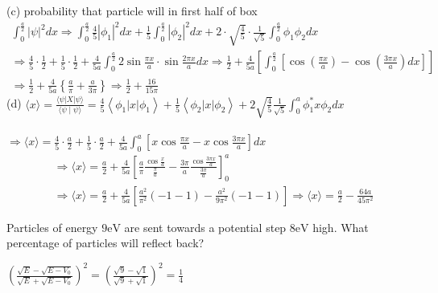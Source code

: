 \begin{enumerate}
\begin{answer}
(c) probability that particle will in first half of box
$$
\begin{gathered}
\int_{0}^{\frac{a}{2}}|\psi|^{2} d x \Rightarrow \int_{0}^{\frac{a}{2}} \frac{4}{5}\left|\phi_{1}\right|^{2} d x+\frac{1}{5} \int_{0}^{\frac{a}{2}}\left|\phi_{2}\right|^{2} d x+2 \cdot \sqrt{\frac{4}{5}} \cdot \frac{1}{\sqrt{5}} \int_{0}^{\frac{a}{2}} \phi_{1} \phi_{2} d x \\
\Rightarrow \frac{4}{5} \cdot \frac{1}{2}+\frac{1}{5} \cdot \frac{1}{2}+\frac{4}{5 a} \int_{0}^{\frac{a}{2}} 2 \sin \frac{\pi x}{a} \cdot \sin \frac{2 \pi x}{a} d x \Rightarrow \frac{1}{2}+\frac{4}{5 a}\left[\int_{0}^{\frac{a}{2}}\left[\cos \left(\frac{\pi x}{a}\right)-\cos \left(\frac{3 \pi x}{a}\right) d x\right]\right] \\
\Rightarrow \frac{1}{2}+\frac{4}{5 a}\left\{\frac{a}{\pi}+\frac{a}{3 \pi}\right\} \Rightarrow \frac{1}{2}+\frac{16}{15 \pi}
\end{gathered}
$$
(d) $\langle x\rangle=\frac{\langle\psi|X| \psi\rangle}{\langle\psi \mid \psi\rangle}=\frac{4}{5}\left\langle\phi_{1}|x| \phi_{1}\right\rangle+\frac{1}{5}\left\langle\phi_{2}|x| \phi_{2}\right\rangle+2 \sqrt{\frac{4}{5}} \frac{1}{\sqrt{5}} \int_{0}^{a} \phi_{1}^{*} x \phi_{2} d x$\\\\ $\Rightarrow\langle x\rangle=\frac{4}{5} \cdot \frac{a}{2}+\frac{1}{5} \cdot \frac{a}{2}+\frac{4}{5 a} \int_{0}^{a}\left[x \cos \frac{\pi x}{a}-x \cos \frac{3 \pi x}{a}\right] d x$
\begin{align*}
&\Rightarrow\langle x\rangle=\frac{a}{2}+\frac{4}{5 a}\left[\frac{a}{\pi} \frac{\cos \frac{x}{a}}{\frac{\pi}{a}}-\frac{3 \pi}{a} \frac{\cos \frac{3 \pi x}{a}}{\frac{3 \pi}{a}}\right]_{0}^{a} \\
&\Rightarrow\langle x\rangle=\frac{a}{2}+\frac{4}{5 a}\left[\frac{a^{2}}{\pi^{2}}(-1-1)-\frac{a^{2}}{9 \pi^{2}}(-1-1)\right] \Rightarrow\langle x\rangle=\frac{a}{2}-\frac{64 a}{45 \pi^{2}}
\end{align*}	
\end{answer}
	\begin{minipage}{\textwidth}
	\item Particles of energy $9 \mathrm{eV}$ are sent towards a potential step $8 \mathrm{eV}$ high. What percentage of particles will reflect back?
\end{minipage}
\begin{answer}
	$\left(\frac{\sqrt{E}-\sqrt{E-V_{0}}}{\sqrt{E}+\sqrt{E-V_{0}}}\right)^{2}=\left(\frac{\sqrt{9}-\sqrt{1}}{\sqrt{9}+\sqrt{1}}\right)^{2}=\frac{1}{4}$\\\\

\end{answer}
\end{enumerate}
